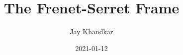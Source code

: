 \documentclass{article}
\title{The Frenet-Serret Frame}
\date{2021-01-12}
\author{Jay Khandkar}
\begin{document}
	\maketitle
	\newpage
	\color{blue}
	\tableofcontents
	\color{black}
	\newpage
	
	\newcommand{\vect}[1]{\mathbf{#1}}
	\newcommand{\Mod}[1]{\lvert #1 \rvert}
	\newcommand{\ModFrac}[2]{\displaystyle\left\lvert \frac{#1}{#2} \right\rvert}
	\newcommand{\VectDiff}[1]{\dot{\vect{#1}}}
	\newcommand{\uveci}{{\bm{\hat{\textnormal{\bfseries\i}}}}}
    \newcommand{\uvecj}{{\bm{\hat{\textnormal{\bfseries\j}}}}}
    \newcommand{\uveck}{{\bm{\hat{\textnormal{\bfseries k}}}}}
    \newcommand*\widefbox[1]{\fbox{\hspace{2em}#1\hspace{2em}}}
    
\end{document}
